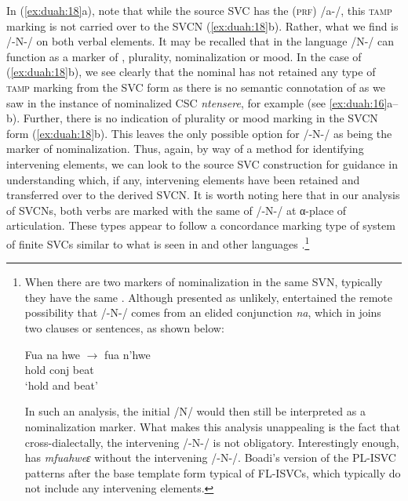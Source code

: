 \documentclass[output=paper,modfonts,nonflat,
colorlinks, citecolor=brown,
]{langsci/langscibook}
\begin{document}
 
In (\ref{ex:duah:18}a), note that while the source SVC has the  (\textsc{prf}) /a-/, this \textsc{tamp} marking is not carried over to the SVCN (\ref{ex:duah:18}b). Rather, what we find is /-N-/ on both verbal elements. It may be recalled that in the  language /N-/ can function as a marker of , plurality, nominalization or mood. In the case of (\ref{ex:duah:18}b), we see clearly that the nominal has not retained any type of \textsc{tamp} marking from the SVC form as there is no semantic connotation of  as we saw in the instance of nominalized CSC \textit{ntensere}, for example (see \ref{ex:duah:16}a--b). Further, there is no indication of plurality or mood marking in the SVCN form (\ref{ex:duah:18}b). This leaves the only possible option for /-N-/ as being the marker of nominalization. Thus, again, by way of a method for identifying intervening elements, we can look to the source SVC construction for guidance in understanding which, if any, intervening elements have been retained and transferred over to the derived SVCN. It is worth noting here that in our analysis of SVCNs, both verbs are marked with the same  of /-N-/ at α-place of articulation. These types appear to follow a concordance marking type of system of finite SVCs similar to what is seen in  and other  languages \citep{aikhenvald2006}.\footnote{When there are two markers of nominalization in the same SVN, typically they have the same . Although presented as unlikely, \citet[211]{kambon2012} entertained the remote possibility that /-N-/ comes from an elided conjunction \textit{na}, which in  joins two clauses or sentences, as shown below:

\ea\label{ex:duah:19}  
\gll	Fua    	na       	hwe  $\rightarrow$    fua n’hwe\\
hold 	conj 	beat {} {} {} \\
\glt `hold and beat'
\z

In such an analysis, the initial /N/ would then still be interpreted as a nominalization marker. What makes this analysis unappealing is the fact that cross-dialectally, the intervening /-N-/ is not obligatory. Interestingly enough, \citet{boadi2005} has \textit{mfuahweɛ} without the intervening \linebreak /-N-/. Boadi’s version of the PL-ISVC patterns after the base template form typical of FL-ISVCs, which typically do not include any intervening elements.}
\end{document}
